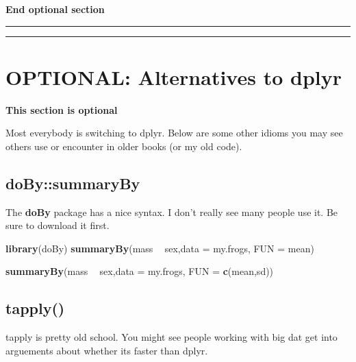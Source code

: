 \documentclass[]{book}
\newenvironment{Shaded}{\begin{snugshade}}{\end{snugshade}}
\newcommand{\KeywordTok}[1]{\textcolor[rgb]{0.13,0.29,0.53}{\textbf{#1}}}
\newcommand{\DataTypeTok}[1]{\textcolor[rgb]{0.13,0.29,0.53}{#1}}
\newcommand{\StringTok}[1]{\textcolor[rgb]{0.31,0.60,0.02}{#1}}
\newcommand{\OperatorTok}[1]{\textcolor[rgb]{0.81,0.36,0.00}{\textbf{#1}}}
\newcommand{\NormalTok}[1]{#1}
\theoremstyle{definition}
\theoremstyle{definition}
\theoremstyle{definition}
\theoremstyle{remark}
\begin{document}
\textbf{End optional section}

\begin{center}\rule{0.5\linewidth}{\linethickness}\end{center}

\begin{center}\rule{0.5\linewidth}{\linethickness}\end{center}

\section{OPTIONAL: Alternatives to
dplyr}\label{optional-alternatives-to-dplyr}

\textbf{This section is optional}

Most everybody is switching to dplyr. Below are some other idioms you
may see others use or encounter in older books (or my old code).

\subsection{doBy::summaryBy}\label{dobysummaryby}

The \textbf{doBy} package has a nice syntax. I don't really see many
people use it. Be sure to download it first.

\begin{Shaded}
\begin{Highlighting}[]
\KeywordTok{library}\NormalTok{(doBy)}
\KeywordTok{summaryBy}\NormalTok{(mass }\OperatorTok{~}\StringTok{ }\NormalTok{sex,}\DataTypeTok{data =}\NormalTok{ my.frogs, }\DataTypeTok{FUN =}\NormalTok{ mean)}

\KeywordTok{summaryBy}\NormalTok{(mass }\OperatorTok{~}\StringTok{ }\NormalTok{sex,}\DataTypeTok{data =}\NormalTok{ my.frogs, }\DataTypeTok{FUN =} \KeywordTok{c}\NormalTok{(mean,sd))}
\end{Highlighting}
\end{Shaded}

\subsection{tapply()}\label{tapply}

tapply is pretty old school. You might see people working with big dat
get into arguements about whether its faster than dplyr.

\begin{Shaded}
\end{Shaded}
\end{document}
